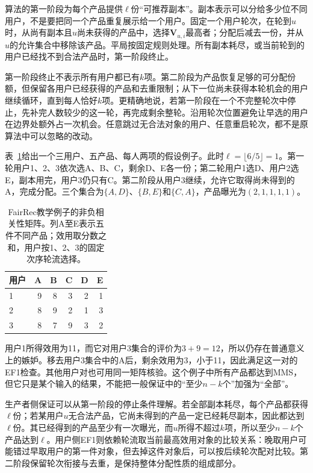 算法的第一阶段为每个产品提供$\ell$份“可推荐副本”。副本表示可以分给多少位不同用户，不是要把同一个产品重复展示给一个用户。固定一个用户轮次，在轮到$u$时，从尚有副本且$u$尚未获得的产品中，选择$\bm{V}_{u,i}$最高者；分配后减去一份，并从$u$的允许集合中移除该产品。平局按固定规则处理。所有副本耗尽，或当前轮到的用户已经找不到合法产品时，第一阶段终止。

第一阶段终止不表示所有用户都已有$k$项。第二阶段为产品恢复足够的可分配份额，但保留各用户已经获得的产品和去重限制；从下一位尚未获得本轮机会的用户继续循环，直到每人恰好$k$项。更精确地说，若第一阶段在一个不完整轮次中停止，先补完人数较少的这一轮，再完成剩余整轮。沿用轮次位置避免让早选的用户在边界处额外占一次机会。任意跳过无合法对象的用户、任意重启轮次，都不是原算法中可以忽略的改动。

表~\ref{tab:rs-fairrec-example}给出一个三用户、五产品、每人两项的假设例子。此时$\ell=\lfloor6/5\rfloor=1$。第一轮用户1、2、3依次选A、B、C，剩余D、E各一份；第二轮用户1选D、用户2选E，副本用完，用户3仍只有C。第二阶段从用户3继续，允许它取得尚未得到的A，完成分配。三个集合为$\{A,D\}$、$\{B,E\}$和$\{C,A\}$，产品曝光为$(2,1,1,1,1)$。

\begin{table}[htbp]
 \centering
 \small
 \begin{tabular}{@{}lrrrrr@{}}
  \toprule
  用户 & A & B & C & D & E \\
  \midrule
  1 & 9 & 8 & 3 & 2 & 1 \\
  2 & 8 & 9 & 2 & 1 & 3 \\
  3 & 8 & 7 & 9 & 3 & 2 \\
  \bottomrule
 \end{tabular}
 \caption{FairRec教学例子的非负相关性矩阵。列A至E表示五件不同产品；效用取分数之和，用户按1、2、3的固定次序轮流选择。}
 \label{tab:rs-fairrec-example}
\end{table}

用户1所得效用为11，而它对用户3集合的评价为$3+9=12$，所以仍存在普通意义上的嫉妒。移去用户3集合中的A后，剩余效用为3，小于11，因此满足这一对的EF1检查。其他用户对也可用同一矩阵核验。这个例子中所有产品都达到MMS，但它只是某个输入的结果，不能把一般保证中的“至少$n-k$个”加强为“全部”。

生产者侧保证可以从第一阶段的停止条件理解。若全部副本耗尽，每个产品都获得$\ell$份；若某用户$u$无合法产品，它尚未得到的产品一定已经耗尽副本，因此都达到$\ell$份。其已经得到的产品至少有一次曝光，而$u$所得不超过$k$项，所以至少$n-k$个产品达到$\ell$。用户侧EF1则依赖轮流取当前最高效用对象的比较关系：晚取用户可能错过早取用户的第一件对象，但去掉这件对象后，可以按后续轮次配对比较。第二阶段保留轮次衔接与去重，是保持整体分配性质的组成部分。

